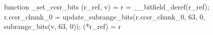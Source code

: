 function _set_ccsr_bits (r_ref, v) = {
    r = __bitfield_deref(r_ref);
    r.ccsr_chunk_0 = update_subrange_bits(r.ccsr_chunk_0, 63, 0, subrange_bits(v, 63, 0));
    (*r_ref) = r
}
